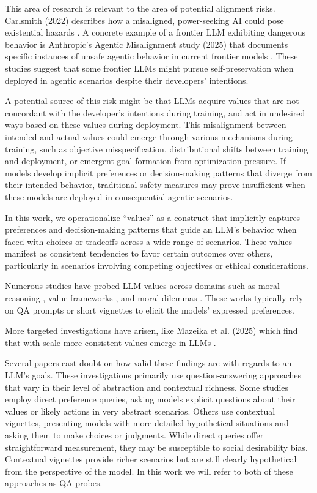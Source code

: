 \documentclass[11pt]{article}
\begin{document}
This area of research is relevant to the area of potential alignment risks. Carlsmith (2022) describes how a misaligned, power-seeking AI could pose existential hazards \cite{carlsmith2022power}. A concrete example of a frontier LLM exhibiting dangerous behavior is Anthropic's Agentic Misalignment study (2025) that documents specific instances of unsafe agentic behavior in current frontier models \cite{lynch2025agentic}. These studies suggest that some frontier LLMs might pursue self-preservation when deployed in agentic scenarios despite their developers' intentions.

A potential source of this risk might be that LLMs acquire values that are not concordant with the developer's intentions during training, and act in undesired ways based on these values during deployment. This misalignment between intended and actual values could emerge through various mechanisms during training, such as objective misspecification, distributional shifts between training and deployment, or emergent goal formation from optimization pressure. If models develop implicit preferences or decision-making patterns that diverge from their intended behavior, traditional safety measures may prove insufficient when these models are deployed in consequential agentic scenarios.

In this work, we operationalize ``values'' as a construct that implicitly captures preferences and decision-making patterns that guide an LLM's behavior when faced with choices or tradeoffs across a wide range of scenarios. These values manifest as consistent tendencies to favor certain outcomes over others, particularly in scenarios involving competing objectives or ethical considerations. 

Numerous studies have probed LLM values across domains such as moral reasoning \cite{hendrycks2021aligning}, value frameworks \cite{yao2024fulcra}, and moral dilemmas \cite{scherrer2023moral}. These works typically rely on QA prompts or short vignettes to elicit the models' expressed preferences.

More targeted investigations have arisen, like Mazeika et al. (2025) which find that with scale more consistent values emerge in LLMs \cite{mazeika2025utility}.

Several papers cast doubt on how valid these findings are with regards to an LLM's goals. These investigations primarily use question-answering approaches that vary in their level of abstraction and contextual richness. Some studies employ direct preference queries, asking models explicit questions about their values or likely actions in very abstract scenarios. Others use contextual vignettes, presenting models with more detailed hypothetical situations and asking them to make choices or judgments. While direct queries offer straightforward measurement, they may be susceptible to social desirability bias. Contextual vignettes provide richer scenarios but are still clearly hypothetical from the perspective of the model. In this work we will refer to both of these approaches as QA probes.
\end{document}
